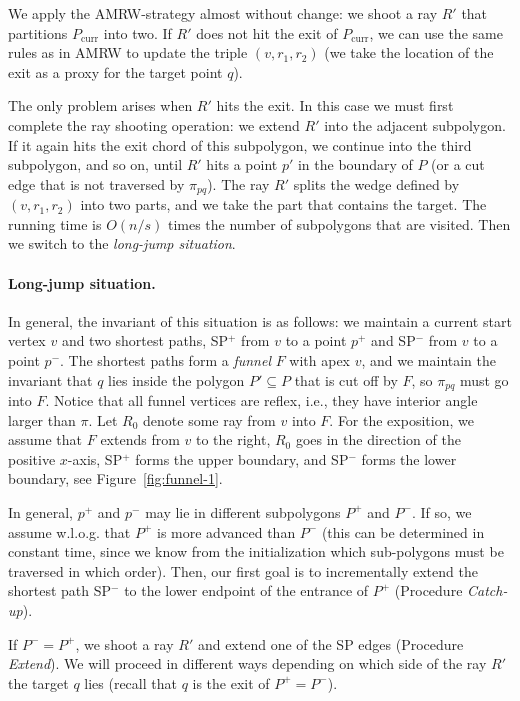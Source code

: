 \documentclass[11pt,a4paper]{article}
\begin{document}
We apply the AMRW-strategy almost without change:
we shoot a ray $R'$ that partitions $P_\text{curr}$
into two. If $R'$ does not hit the exit of $P_\text{curr}$, we can use the same
rules as in AMRW to update the triple $(v, r_1, r_2)$ (we take the location of the
exit as a proxy for the target point $q$).

The only problem arises when $R'$ hits the exit.
In this case we must first complete the ray shooting operation:
we extend $R'$ into the adjacent subpolygon. If it again hits the
exit chord of this subpolygon, we continue into the third subpolygon, and so on,
until $R'$ hits a point $p'$ in the boundary of $P$ (or a cut edge that is not
traversed by $\pi_{pq}$). The ray $R'$ splits the wedge defined by $(v, r_1, r_2)$
into two parts, and we take the part that contains the target.
The running time is $O(n/s)$ times the number of subpolygons that are visited.
Then we switch to the \emph{long-jump situation}.
\paragraph{Long-jump situation.}
In general, the invariant of this situation is as follows:
we  maintain a current start vertex $v$ and two
shortest paths, SP$^+$ from $v$ to a point $p^+$
and SP$^-$ from $v$ to a point $p^-$.
The shortest paths form a \emph{funnel} $F$ with apex $v$,
and we maintain the invariant that $q$ lies inside the polygon $P' \subseteq P$
that is cut off by $F$, so $\pi_{pq}$ must go into $F$. Notice that all
funnel vertices are reflex, i.e., they have
interior angle larger than $\pi$.
Let $R_0$ denote some ray from $v$ into $F$.
For the exposition, we assume that $F$ extends from
$v$ to the right, $R_0$ goes in the direction of the positive $x$-axis,
SP$^+$ forms the upper boundary, and SP$^-$ forms the lower boundary, see
Figure~\ref{fig:funnel-1}.

In general, $p^+$ and $p^-$ may lie in different subpolygons $P^+$
and $P^-$. If so, we  assume w.l.o.g.
that $P^+$ is more advanced than $P^-$
(this can be determined in constant time, since we know from the initialization
which sub-polygons must be traversed in which order). Then, our first goal is to
 incrementally extend the shortest path SP$^-$ to the
lower endpoint of the entrance of $P^+$ (Procedure \emph{Catch-up}).

If $P^-=P^+$, we shoot a ray $R'$ and extend one of the
SP edges (Procedure \emph{Extend}). We will proceed in different
ways depending on which side of the ray $R'$ the target $q$
lies (recall that $q$ is the exit of $P^+=P^-$).
\end{document}

